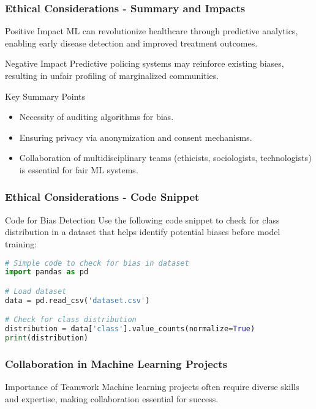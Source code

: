 \documentclass[aspectratio=169]{beamer}
\begin{document}
\begin{frame}[fragile]
    \frametitle{Ethical Considerations - Summary and Impacts}
    \begin{block}{Positive Impact}
        ML can revolutionize healthcare through predictive analytics, enabling early disease detection and improved treatment outcomes.
    \end{block}

    \begin{block}{Negative Impact}
        Predictive policing systems may reinforce existing biases, resulting in unfair profiling of marginalized communities.
    \end{block}

    \begin{block}{Key Summary Points}
        \begin{itemize}
            \item Necessity of auditing algorithms for bias.
            \item Ensuring privacy via anonymization and consent mechanisms.
            \item Collaboration of multidisciplinary teams (ethicists, sociologists, technologists) is essential for fair ML systems.
        \end{itemize}
    \end{block}
\end{frame}

\begin{frame}[fragile]
    \frametitle{Ethical Considerations - Code Snippet}
    \begin{block}{Code for Bias Detection}
        Use the following code snippet to check for class distribution in a dataset that helps identify potential biases before model training:
    \end{block}
    
    \begin{lstlisting}[language=Python]
# Simple code to check for bias in dataset
import pandas as pd

# Load dataset
data = pd.read_csv('dataset.csv')

# Check for class distribution
distribution = data['class'].value_counts(normalize=True)
print(distribution)
    \end{lstlisting}
\end{frame}

\begin{frame}[fragile]
    \frametitle{Collaboration in Machine Learning Projects}
    \begin{block}{Importance of Teamwork}
        Machine learning projects often require diverse skills and expertise, making collaboration essential for success. 
    \end{block}
\end{frame}
\end{document}
